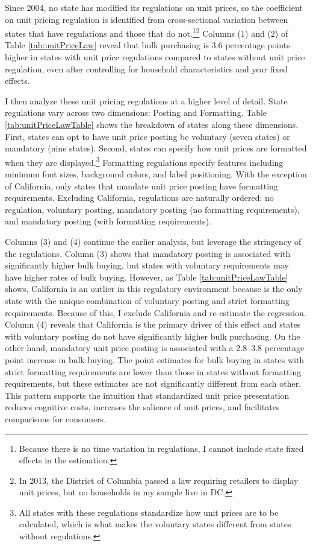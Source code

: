\documentclass[AER]{AEA_mal}
\begin{document}
Since 2004, no state has modified its regulations on unit prices, so the coefficient on unit pricing regulation is identified from cross-sectional variation between states that have regulations and those that do not.\footnote{Because there is no time variation in regulations, I cannot include state fixed effects in the estimation.}\footnote{In 2013, the District of Columbia passed a law requiring retailers to display unit prices, but no households in my sample live in DC.} Columns (1) and (2) of Table \ref{tab:unitPriceLaw} reveal that bulk purchasing is 3.6 percentage points higher in states with unit price regulations compared to states without unit price regulation, even after controlling for household characteristics and year fixed effects.



I then analyze these unit pricing regulations at a higher level of detail. State regulations vary across two dimensions: Posting and Formatting. Table \ref{tab:unitPriceLawTable} shows the breakdown of states along these dimensions. First, states can opt to have unit price posting be voluntary (seven states) or mandatory (nine states). Second, states can specify how unit prices are formatted when they are displayed.\footnote{All states with these regulations standardize how unit prices are to be calculated, which is what makes the voluntary states different from states without regulations.} Formatting regulations specify features including minimum font sizes, background colors, and label positioning. With the exception of California, only states that mandate unit price posting have formatting requirements. Excluding California, regulations are naturally ordered: no regulation, voluntary posting, mandatory posting (no formatting requirements), and mandatory posting (with formatting requirements).



Columns (3) and (4) continue the earlier analysis, but leverage the stringency of the regulations. Column (3) shows that mandatory posting is associated with significantly higher bulk buying, but states with voluntary requirements may have higher rates of bulk buying. However, as Table \ref{tab:unitPriceLawTable} shows, California is an outlier in this regulatory environment because is the only state with the unique combination of voluntary posting and strict formatting requirements. Because of this, I exclude California and re-estimate the regression. Column (4) reveals that California is the primary driver of this effect and states with voluntary posting do not have significantly higher bulk purchasing. On the other hand, mandatory unit price posting is associated with a 2.8--3.8 percentage point increase in bulk buying. The point estimates for bulk buying in states with strict formatting requirements are lower than those in states without formatting requirements, but these estimates are not significantly different from each other. This pattern supports the intuition that standardized unit price presentation reduces cognitive costs, increases the salience of unit prices, and facilitates comparisons for consumers.
\end{document}
